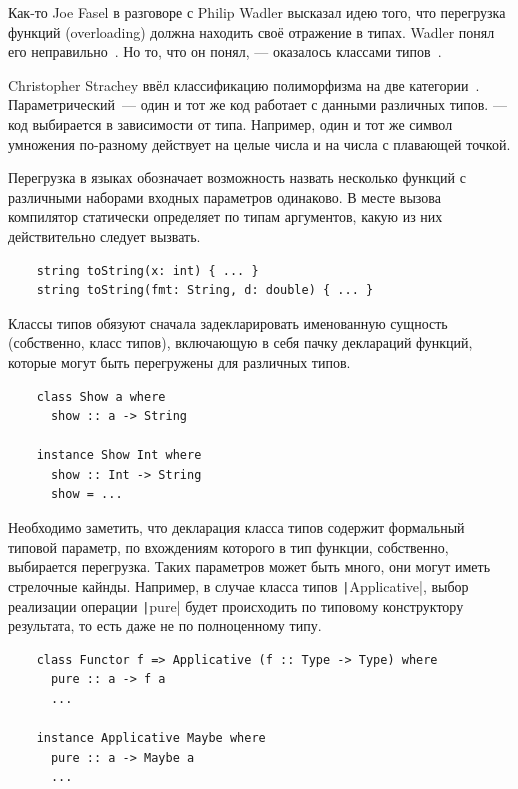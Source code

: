
Как-то Joe Fasel в разговоре с Philip Wadler высказал идею того, что перегрузка функций (overloading) должна находить своё отражение в типах.
Wadler понял его неправильно~\cite{hudak2007history}.
Но то, что он понял, --- оказалось классами типов~\cite{wadler1989make}.

Christopher Strachey ввёл классификацию полиморфизма на две категории~\cite{strachey2000fundamental}.
Параметрический~--- один и тот же код работает с данными различных типов.
 --- код выбирается в зависимости от типа.
Например, один и тот же символ умножения по-разному действует на целые числа и на числа с плавающей точкой.

Перегрузка в языках обозначает возможность назвать несколько функций с различными наборами входных параметров одинаково.
В месте вызова компилятор статически определяет по типам аргументов, какую из них действительно следует вызвать.
\begin{verbatim}
    string toString(x: int) { ... }
    string toString(fmt: String, d: double) { ... }
\end{verbatim}

Классы типов обязуют сначала задекларировать именованную сущность (собственно, класс типов), включающую в себя пачку деклараций функций, которые могут быть перегружены для различных типов.
\begin{verbatim}
    class Show a where
      show :: a -> String

    instance Show Int where
      show :: Int -> String
      show = ...
\end{verbatim}

Необходимо заметить, что декларация класса типов содержит формальный типовой параметр, по вхождениям которого в тип функции, собственно, выбирается перегрузка.
Таких параметров может быть много, они могут иметь стрелочные кайнды.
Например, в случае класса типов \texttt|Applicative|, выбор реализации операции \texttt|pure| будет происходить по типовому конструктору результата, то есть даже не по полноценному типу.
\begin{verbatim}
    class Functor f => Applicative (f :: Type -> Type) where
      pure :: a -> f a
      ...

    instance Applicative Maybe where
      pure :: a -> Maybe a
      ...
\end{verbatim}

